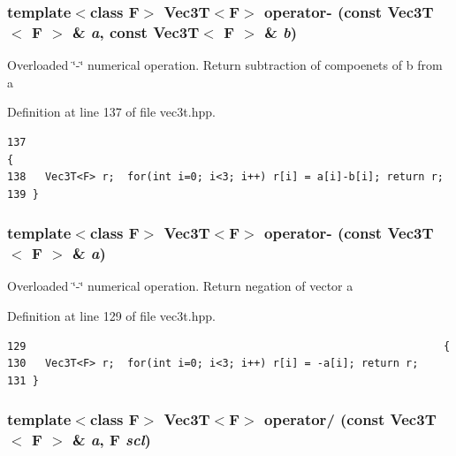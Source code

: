 \subsubsection{\setlength{\rightskip}{0pt plus 5cm}template$<$class F$>$ {\bf Vec3T}$<$F$>$ operator- (const {\bf Vec3T}$<$ F $>$ \& {\em a}, const {\bf Vec3T}$<$ F $>$ \& {\em b})\hspace{0.3cm}{\tt  [inline]}}\label{vec3t_8hpp_958f435f39061422379a1f551ca0e7de_958f435f39061422379a1f551ca0e7de}


Overloaded \char`\"{}-\char`\"{} numerical operation. Return subtraction of compoenets of b from a 

Definition at line 137 of file vec3t.hpp.

\footnotesize\begin{verbatim}137                                                                                     {
138   Vec3T<F> r;  for(int i=0; i<3; i++) r[i] = a[i]-b[i]; return r;
139 }
\end{verbatim}\normalsize 


\subsubsection{\setlength{\rightskip}{0pt plus 5cm}template$<$class F$>$ {\bf Vec3T}$<$F$>$ operator- (const {\bf Vec3T}$<$ F $>$ \& {\em a})\hspace{0.3cm}{\tt  [inline]}}\label{vec3t_8hpp_4fe61668af64f757aa7523fb9663bc06_4fe61668af64f757aa7523fb9663bc06}


Overloaded \char`\"{}-\char`\"{} numerical operation. Return negation of vector a 

Definition at line 129 of file vec3t.hpp.

\footnotesize\begin{verbatim}129                                                                  {
130   Vec3T<F> r;  for(int i=0; i<3; i++) r[i] = -a[i]; return r;
131 }
\end{verbatim}\normalsize 


\subsubsection{\setlength{\rightskip}{0pt plus 5cm}template$<$class F$>$ {\bf Vec3T}$<$F$>$ operator/ (const {\bf Vec3T}$<$ F $>$ \& {\em a}, F {\em scl})\hspace{0.3cm}{\tt  [inline]}}\label{vec3t_8hpp_7611b994daf0087093435c6aff237959_7611b994daf0087093435c6aff237959}


